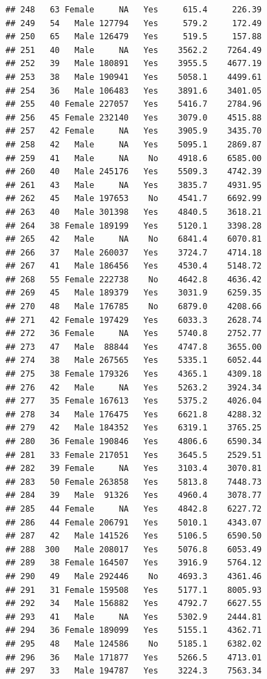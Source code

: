 \documentclass[12pt,]{krantz}
\theoremstyle{definition}
\theoremstyle{definition}
\theoremstyle{remark}
\begin{document}
\begin{verbatim}
## 248   63 Female     NA   Yes     615.4     226.39
## 249   54   Male 127794   Yes     579.2     172.49
## 250   65   Male 126479   Yes     519.5     157.88
## 251   40   Male     NA   Yes    3562.2    7264.49
## 252   39   Male 180891   Yes    3955.5    4677.19
## 253   38   Male 190941   Yes    5058.1    4499.61
## 254   36   Male 106483   Yes    3891.6    3401.05
## 255   40 Female 227057   Yes    5416.7    2784.96
## 256   45 Female 232140   Yes    3079.0    4515.88
## 257   42 Female     NA   Yes    3905.9    3435.70
## 258   42   Male     NA   Yes    5095.1    2869.87
## 259   41   Male     NA    No    4918.6    6585.00
## 260   40   Male 245176   Yes    5509.3    4742.39
## 261   43   Male     NA   Yes    3835.7    4931.95
## 262   45   Male 197653    No    4541.7    6692.99
## 263   40   Male 301398   Yes    4840.5    3618.21
## 264   38 Female 189199   Yes    5120.1    3398.28
## 265   42   Male     NA    No    6841.4    6070.81
## 266   37   Male 260037   Yes    3724.7    4714.18
## 267   41   Male 186456   Yes    4530.4    5148.72
## 268   55 Female 222738    No    4642.8    4636.42
## 269   45   Male 189379   Yes    3031.9    6259.35
## 270   48   Male 176785    No    6879.0    4208.66
## 271   42 Female 197429   Yes    6033.3    2628.74
## 272   36 Female     NA   Yes    5740.8    2752.77
## 273   47   Male  88844   Yes    4747.8    3655.00
## 274   38   Male 267565   Yes    5335.1    6052.44
## 275   38 Female 179326   Yes    4365.1    4309.18
## 276   42   Male     NA   Yes    5263.2    3924.34
## 277   35 Female 167613   Yes    5375.2    4026.04
## 278   34   Male 176475   Yes    6621.8    4288.32
## 279   42   Male 184352   Yes    6319.1    3765.25
## 280   36 Female 190846   Yes    4806.6    6590.34
## 281   33 Female 217051   Yes    3645.5    2529.51
## 282   39 Female     NA   Yes    3103.4    3070.81
## 283   50 Female 263858   Yes    5813.8    7448.73
## 284   39   Male  91326   Yes    4960.4    3078.77
## 285   44 Female     NA   Yes    4842.8    6227.72
## 286   44 Female 206791   Yes    5010.1    4343.07
## 287   42   Male 141526   Yes    5106.5    6590.50
## 288  300   Male 208017   Yes    5076.8    6053.49
## 289   38 Female 164507   Yes    3916.9    5764.12
## 290   49   Male 292446    No    4693.3    4361.46
## 291   31 Female 159508   Yes    5177.1    8005.93
## 292   34   Male 156882   Yes    4792.7    6627.55
## 293   41   Male     NA   Yes    5302.9    2444.81
## 294   36 Female 189099   Yes    5155.1    4362.71
## 295   48   Male 124586    No    5185.1    6382.02
## 296   36   Male 171877   Yes    5266.5    4713.01
## 297   33   Male 194787   Yes    3224.3    7563.34

\end{verbatim}
\end{document}
